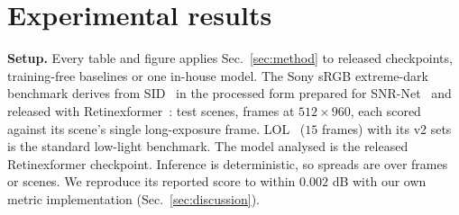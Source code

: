 \section{Experimental results}
\label{sec:results}

\noindent\textbf{Setup.} Every table and figure applies Sec.~\ref{sec:method} to released checkpoints, training-free baselines or one in-house model. The Sony sRGB extreme-dark benchmark derives from SID~\cite{sid2018} in the processed form prepared for SNR-Net~\cite{snrnet2022} and released with Retinexformer~\cite{retinexformer}: \nNSCENE{} test scenes, \nNIMG{} frames at $512\times960$, each scored against its scene's single long-exposure frame. LOL~\cite{lol2018} ($15$ frames) with its v2 sets~\cite{lolv2_2021} is the standard low-light benchmark. The model analysed is the released Retinexformer checkpoint. Inference is deterministic, so spreads are over frames or scenes. We reproduce its reported score
to within \(0.002\) dB with our own metric implementation (Sec.~\ref{sec:discussion}).




